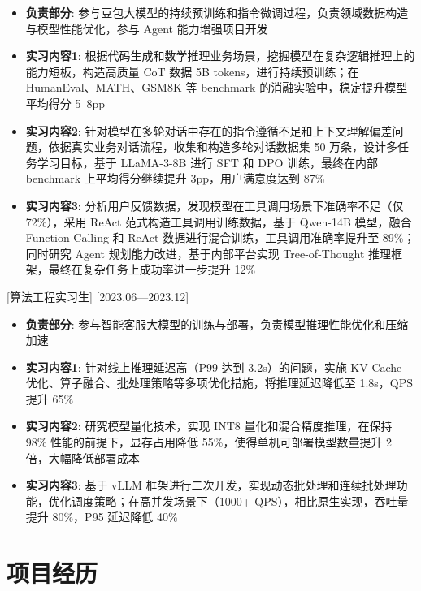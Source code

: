 \documentclass{resume-photo}
\begin{document}
\begin{itemize}
  \item \textbf{负责部分}: 参与豆包大模型的持续预训练和指令微调过程，负责领域数据构造与模型性能优化，参与 Agent 能力增强项目开发
  \item \textbf{实习内容1}: 根据代码生成和数学推理业务场景，挖掘模型在复杂逻辑推理上的能力短板，构造高质量 CoT 数据 5B tokens，进行持续预训练；在 HumanEval、MATH、GSM8K 等 benchmark 的消融实验中，稳定提升模型平均得分 5~8pp
  \item \textbf{实习内容2}: 针对模型在多轮对话中存在的指令遵循不足和上下文理解偏差问题，依据真实业务对话流程，收集和构造多轮对话数据集 50 万条，设计多任务学习目标，基于 LLaMA-3-8B 进行 SFT 和 DPO 训练，最终在内部 benchmark 上平均得分继续提升 3pp，用户满意度达到 87\%
  \item \textbf{实习内容3}: 分析用户反馈数据，发现模型在工具调用场景下准确率不足（仅 72\%），采用 ReAct 范式构造工具调用训练数据，基于 Qwen-14B 模型，融合 Function Calling 和 ReAct 数据进行混合训练，工具调用准确率提升至 89\%；同时研究 Agent 规划能力改进，基于内部平台实现 Tree-of-Thought 推理框架，最终在复杂任务上成功率进一步提升 12\%
\end{itemize}

[\textnormal{算法工程实习生}]
[2023.06—2023.12]

\begin{itemize}
  \item \textbf{负责部分}: 参与智能客服大模型的训练与部署，负责模型推理性能优化和压缩加速
  \item \textbf{实习内容1}: 针对线上推理延迟高（P99 达到 3.2s）的问题，实施 KV Cache 优化、算子融合、批处理策略等多项优化措施，将推理延迟降低至 1.8s，QPS 提升 65\%
  \item \textbf{实习内容2}: 研究模型量化技术，实现 INT8 量化和混合精度推理，在保持 98\% 性能的前提下，显存占用降低 55\%，使得单机可部署模型数量提升 2 倍，大幅降低部署成本
  \item \textbf{实习内容3}: 基于 vLLM 框架进行二次开发，实现动态批处理和连续批处理功能，优化调度策略；在高并发场景下（1000+ QPS），相比原生实现，吞吐量提升 80\%，P95 延迟降低 40\%
\end{itemize}



\section{项目经历}
\end{document}
